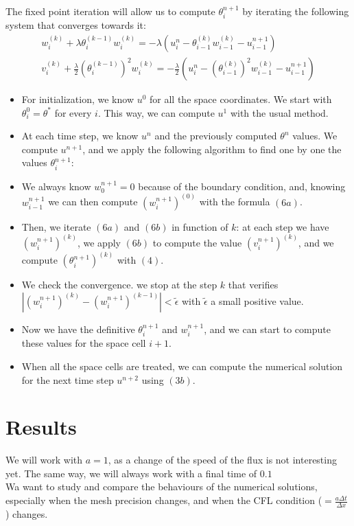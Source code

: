 \documentclass[12pt]{article}
\begin{document}
The fixed point iteration will allow us to compute $\theta_i^{n+1}$ by iterating the following system that converges towards it:
\begin{align*}
    w_i^{(k)} + \lambda \theta_i^{(k-1)} w_i^{(k)} = -\lambda(u_i^n - \theta_{i-1}^{(k)} w_{i-1}^{(k)} - u_{i-1}^{n+1}) \tag{6a}\\
    v_i^{(k)} + \frac{\lambda}{2} (\theta_i^{(k-1)})^2 w_i^{(k)} = -\frac{\lambda}{2} (u_i^n - (\theta_{i-1}^{(k)})^2 w_{i-1}^{(k)} - u_{i-1}^{n+1}) \tag{6b}
\end{align*}

\begin{itemize}
    \item For initialization, we know $u^0$ for all the space coordinates. We start with $\theta_i^0 = \theta^*$ for every $i$. This way, we can compute $u^1$ with the usual method.
    \item At each time step, we know $u^n$ and the previously computed $\theta^n$ values.
We compute $u^{n+1}$, and we apply the following algorithm to find one by one the values $\theta_i^{n+1}$:
    \item We always know $w_0^{n+1} = 0$ because of the boundary condition, and, knowing $w_{i-1}^{n+1}$ we can then compute $(w_i^{n+1})^{(0)}$ with the formula $(6a)$.
    \item Then, we iterate $(6a)$ and $(6b)$ in function of $k$: at each step we have $(w_i^{n+1})^{(k)}$, we apply $(6b)$ to compute the value $(v_i^{n+1})^{(k)}$, and we compute $(\theta_i^{n+1})^{(k)}$ with $(4)$.
    \item We check the convergence. we stop at the step $k$ that verifies $|(w_i^{n+1})^{(k)} - (w_i^{n+1})^{(k-1)}| < \tilde{\epsilon}$ with $\tilde{\epsilon}$ a small positive value. %
    \item Now we have the definitive $\theta_i^{n+1}$ and $w_i^{n+1}$, and we can start to compute these values for the space cell $i+1$.
    \item When all the space cells are treated, we can compute the numerical solution for the next time step $u^{n+2}$ using $(3b)$.
\end{itemize}


\section{Results}
We will work with $a = 1$, as a change of the speed of the flux is not interesting yet. The same way, we will always work with a final time of $0.1$\\
Wa want to study  and compare the behaviours of the numerical solutions, especially when the mesh precision changes, and when the CFL condition ($=\frac{a\Delta t}{\Delta x}$) changes.
\end{document}
